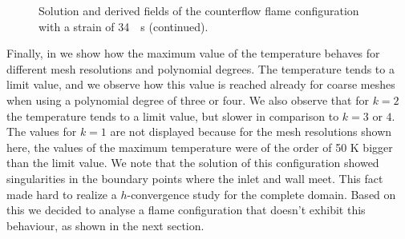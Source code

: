 \begin{figure}[t]
	\ContinuedFloat
	\centering
	\pgfplotsset{width=0.81\textwidth, compat=1.3}	
	\caption{Solution and derived fields of the counterflow flame configuration with a strain of \SI{34}{\per \second} (continued).}%
\end{figure}
Finally, in  we show how the maximum value of the temperature behaves for different mesh resolutions and polynomial degrees. The temperature tends to a limit value, and we observe how this value is reached already for coarse meshes when using a polynomial degree of three or four. We also observe that for $k=2$ the temperature tends to a limit value, but slower in comparison to $k =3$ or $4$. The values for $k=1$ are not displayed because for the mesh resolutions shown here, the values of the maximum temperature were of the order of 50 \si{K} bigger than the limit value. We note that the solution of this configuration showed singularities in the boundary points where the inlet and wall meet. This fact made hard to realize a $h$-convergence study for the complete domain. Based on this we decided to analyse a flame configuration that doesn't exhibit this behaviour, as shown in the next section.

